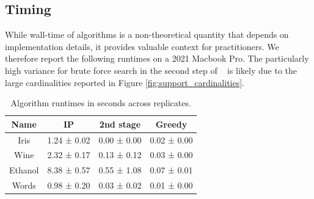 \newpage

\subsection{Timing}
\label{sec:timing}

While wall-time of algorithms is a non-theoretical quantity that depends on implementation details, it provides valuable context for practitioners.
We therefore report the following runtimes on a 2021 Macbook Pro.
The particularly high variance for brute force search in the second step of \tsip~ is likely due to the large cardinalities reported in Figure \ref{fig:support_cardinalities}.

\begin{table}[H]
\centering
\begin{tabular}{|c|c|c|c}
\toprule
Name & IP & 2nd stage & Greedy \\
\midrule
Iris & 1.24 ± 0.02 & 0.00 ± 0.00 & 0.02 ± 0.00 \\
Wine & 2.32 ± 0.17 & 0.13 ± 0.12 & 0.03 ± 0.00 \\
Ethanol & 8.38 ± 0.57 & 0.55 ± 1.08 & 0.07 ± 0.01 \\
Words & 0.98 ± 0.20 & 0.03 ± 0.02 & 0.01 ± 0.00 \\
\bottomrule
\end{tabular}
\caption{Algorithm runtimes in seconds across replicates.}
\end{table}